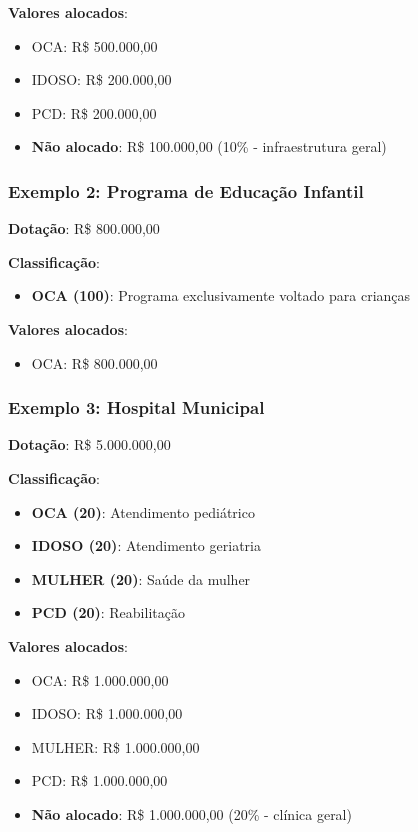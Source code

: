 \documentclass[12pt,a4paper]{article}
\begin{document}
\textbf{Valores alocados}:
\begin{itemize}
    \item OCA: R\$ 500.000,00
    \item IDOSO: R\$ 200.000,00
    \item PCD: R\$ 200.000,00
    \item \textbf{Não alocado}: R\$ 100.000,00 (10\% - infraestrutura geral)
\end{itemize}

\subsubsection{Exemplo 2: Programa de Educação Infantil}

\textbf{Dotação}: R\$ 800.000,00

\textbf{Classificação}:
\begin{itemize}
    \item \textbf{OCA (100)}: Programa exclusivamente voltado para crianças
\end{itemize}

\textbf{Valores alocados}:
\begin{itemize}
    \item OCA: R\$ 800.000,00
\end{itemize}

\subsubsection{Exemplo 3: Hospital Municipal}

\textbf{Dotação}: R\$ 5.000.000,00

\textbf{Classificação}:
\begin{itemize}
    \item \textbf{OCA (20)}: Atendimento pediátrico
    \item \textbf{IDOSO (20)}: Atendimento geriatria
    \item \textbf{MULHER (20)}: Saúde da mulher
    \item \textbf{PCD (20)}: Reabilitação
\end{itemize}

\textbf{Valores alocados}:
\begin{itemize}
    \item OCA: R\$ 1.000.000,00
    \item IDOSO: R\$ 1.000.000,00
    \item MULHER: R\$ 1.000.000,00
    \item PCD: R\$ 1.000.000,00
    \item \textbf{Não alocado}: R\$ 1.000.000,00 (20\% - clínica geral)
\end{itemize}
\end{document}
